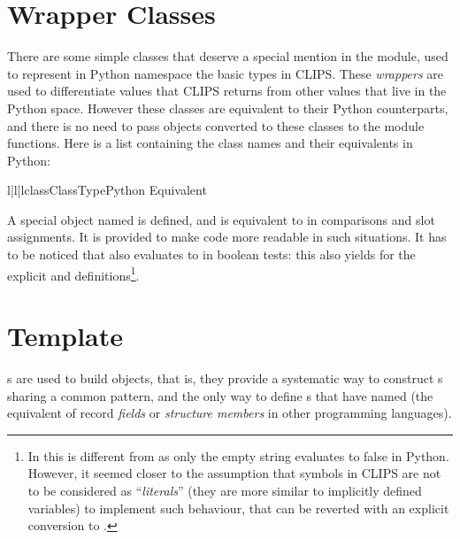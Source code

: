 \section{Wrapper Classes\label{pyclips-cl-wrapper}}

There are some simple classes that deserve a special mention in the
\pyclips{} module, used to represent in Python namespace the basic types
in CLIPS. These \emph{wrappers} are used to differentiate values that
CLIPS returns from other values that live in the Python space.
However these classes are equivalent to their Python counterparts, and
there is no need to pass objects converted to these classes to the module
functions. Here is a list containing the class names and their
equivalents in Python:

\begin{tableiii}{l|l|l}{class}{Class}{Type}{Python Equivalent}
\end{tableiii}

A special object named  is defined, and is equivalent to
 in comparisons and slot assignments. It is provided
to make code more readable in such situations. It has to be noticed that
also  evaluates to  in boolean tests: this also
yields for the explicit  and 
definitions\footnote{In this  is different from 
as only the empty string evaluates to false in Python. However, it seemed
closer to the assumption that symbols in CLIPS are not to be considered
as ``\emph{literals}'' (they are more similar to implicitly defined
variables) to implement such behaviour, that can be reverted with an
explicit conversion to .}.


\section{Template\label{pyclips-cl-Template}}

s are used to build  objects, that is, they
provide a systematic way to construct s sharing a common
pattern, and the only way to define s that have named
 (the equivalent of record \emph{fields} or \emph{structure
members} in other programming languages).


